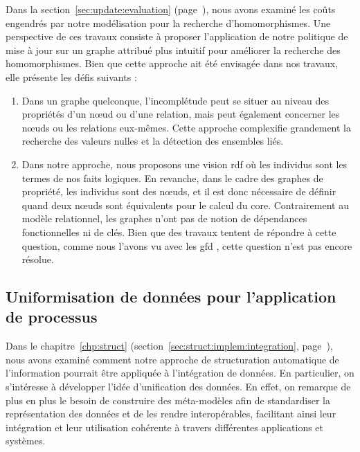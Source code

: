 Dans la section~\ref{sec:update:evaluation} (page~\pageref{sec:update:evaluation}), nous avons examiné les coûts engendrés par notre modélisation pour la recherche d'homomorphismes.
Une perspective de ces travaux consiste à proposer l'application de notre politique de mise à jour sur un graphe attribué plus intuitif pour améliorer la recherche des homomorphismes.
Bien que cette approche ait été envisagée dans nos travaux, elle présente les défis suivants :
\begin{enumerate}
    \item Dans un graphe quelconque, l'incomplétude peut se situer au niveau des propriétés d'un nœud ou d'une relation, mais peut également concerner les nœuds ou les relations eux-mêmes.
    Cette approche complexifie grandement la recherche des valeurs nulles et la détection des ensembles liés.

    \item Dans notre approche, nous proposons une vision \acrshort{rdf} où les individus sont les termes de nos faits logiques.
    En revanche, dans le cadre des graphes de propriété, les individus sont des nœuds, et il est donc nécessaire de définir quand deux nœuds sont équivalents pour le calcul du \gls{core}.
    Contrairement au modèle relationnel, les graphes n'ont pas de notion de dépendances fonctionnelles ni de clés.
    Bien que des travaux tentent de répondre à cette question, comme nous l'avons vu avec les \gls{gfd} \cite{fanDependenciesGraphs2019}, cette question n'est pas encore résolue.
\end{enumerate}

\subsection{Uniformisation de données pour l'application de processus}

Dans le chapitre~\ref{chp:struct} (section~\ref{sec:struct:implem:integration}, page~\pageref{sec:struct:implem:integration}), nous avons examiné comment notre approche de structuration automatique de l'information pourrait être appliquée à l'intégration de données.
En particulier, on s'intéresse à développer l'idée d'unification des données.
En effet, on remarque de plus en plus le besoin de construire des méta-modèles afin de standardiser la représentation des données et de les rendre interopérables, facilitant ainsi leur intégration et leur utilisation cohérente à travers différentes applications et systèmes.

